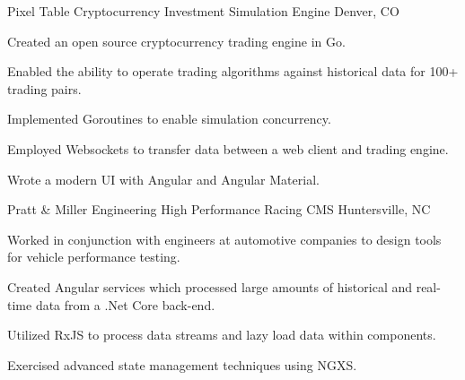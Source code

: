 

\begin{cventries}

    \cventry
    {Pixel Table} %
    {Cryptocurrency Investment Simulation Engine} %
    {Denver, CO} %
    {} %
    {
    \begin{cvitems} %
        \item {Created an open source cryptocurrency trading engine in Go.}
        \item {Enabled the ability to operate trading algorithms against historical data for 100+ trading pairs.}
        \item {Implemented Goroutines to enable simulation concurrency.}
        \item {Employed Websockets to transfer data between a web client and trading engine.}
        \item {Wrote a modern UI with Angular and Angular Material.}
    \end{cvitems}
    }

    \cventry
    {Pratt \& Miller Engineering} %
    {High Performance Racing CMS} %
    {Huntersville, NC} %
    {} %
    {
    \begin{cvitems} %
        \item {Worked in conjunction with engineers at automotive companies to design tools for vehicle performance testing.}
        \item {Created Angular services which processed large amounts of historical and real-time data from a .Net Core back-end.}
        \item {Utilized RxJS to process data streams and lazy load data within components.}
        \item {Exercised advanced state management techniques using NGXS.}
    \end{cvitems}
    }


\end{cventries}
